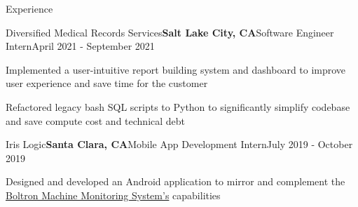 \documentclass{resume}
\begin{document}
\begin{rSection}{\large Experience}
\begin{rSubsection}{Diversified Medical Records Services}{\bf{Salt Lake City, CA}}{Software Engineer Intern}{April 2021 - September 2021}
\item Implemented a user-intuitive report building system and dashboard to improve user experience and save time for the customer
\item Refactored legacy bash SQL scripts to Python to significantly simplify codebase and save compute cost and technical debt
\end{rSubsection}

\begin{rSubsection}{Iris Logic}{\bf{Santa Clara, CA}}{Mobile App Development Intern}{July 2019 - October 2019}
\item Designed and developed an Android application to mirror and complement the \href{https://irislogic.com/boltron-machine-monitoring-system/}{Boltron Machine Monitoring System's} capabilities
\end{rSubsection}
\end{rSection}
\end{document}
